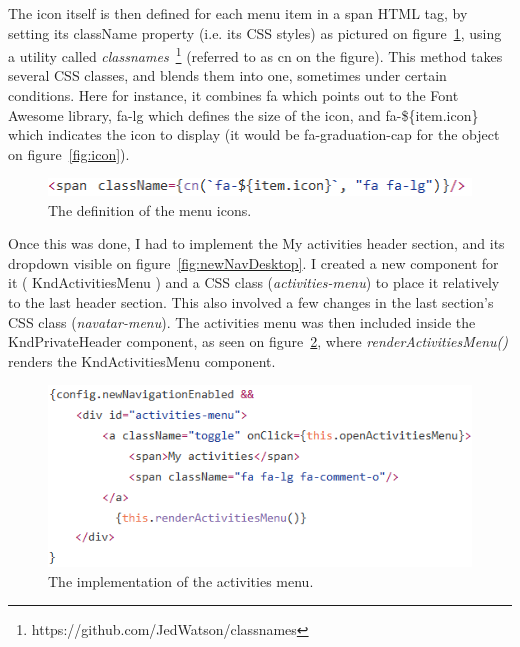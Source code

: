 The icon itself is then defined for each menu item in a span HTML tag, by setting its className property (i.e. its CSS styles) as pictured on {\sc figure}~\ref{fig:classnames}, using a utility called \textit{classnames}~\footnote{https://github.com/JedWatson/classnames} (referred to as \guillemotleft{} cn \guillemotright{} on the figure). This method takes several CSS classes, and blends them into one, sometimes under certain conditions. Here for instance, it combines \guillemotleft{} fa \guillemotright{} which points out to the Font Awesome library, \guillemotleft{} fa-lg \guillemotright{} which defines the size of the icon, and \guillemotleft{} fa-\$\{item.icon\} \guillemotright{} which indicates the icon to display (it would be \guillemotleft{} fa-graduation-cap \guillemotright{} for the object on {\sc figure}~\ref{fig:icon}).

\begin{figure}[H]
    \centering
    \includegraphics[scale=0.9]{figure/classnames.png}
    \caption{The definition of the menu icons.}
    \label{fig:classnames}
\end{figure}

Once this was done, I had to implement the \guillemotleft{} My activities \guillemotright{} header section, and its dropdown visible on {\sc figure}~\ref{fig:newNavDesktop}. I created a new component for it (\guillemotleft{} KndActivitiesMenu \guillemotright{}) and a CSS class (\textit{activities-menu}) to place it relatively to the last header section. This also involved a few changes in the last section's CSS class (\textit{navatar-menu}). The activities menu was then included inside the \guillemotleft{} KndPrivateHeader \guillemotright{} component, as seen on {\sc figure}~\ref{fig:activitiesImpl}, where \textit{renderActivitiesMenu()} renders the KndActivitiesMenu component.

\begin{figure}[H]
    \centering
    \includegraphics[scale=0.9]{figure/activitiesImpl.png}
    \caption{The implementation of the activities menu.}
    \label{fig:activitiesImpl}
\end{figure}

